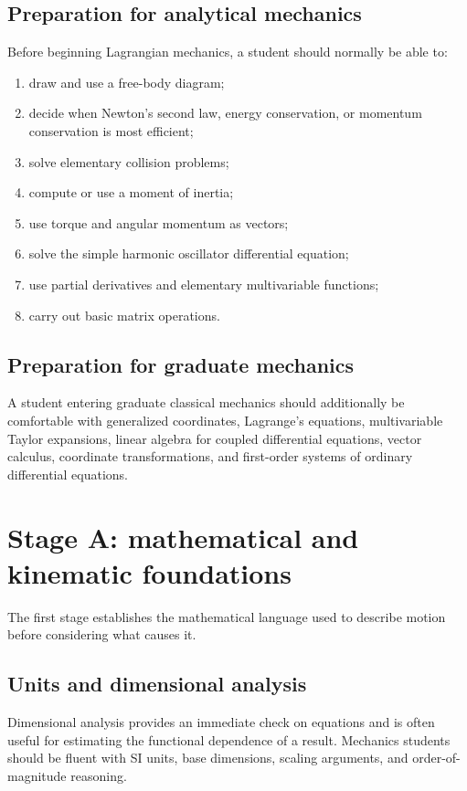 \subsection*{Preparation for analytical mechanics}

Before beginning Lagrangian mechanics, a student should normally be able to:
\begin{enumerate}
\item draw and use a free-body diagram;
\item decide when Newton's second law, energy conservation, or momentum conservation is most efficient;
\item solve elementary collision problems;
\item compute or use a moment of inertia;
\item use torque and angular momentum as vectors;
\item solve the simple harmonic oscillator differential equation;
\item use partial derivatives and elementary multivariable functions;
\item carry out basic matrix operations.
\end{enumerate}

\subsection*{Preparation for graduate mechanics}

A student entering graduate classical mechanics should additionally be comfortable with generalized
coordinates, Lagrange's equations, multivariable Taylor expansions, linear algebra for coupled
differential equations, vector calculus, coordinate transformations, and first-order systems of
ordinary differential equations.

\section{Stage A: mathematical and kinematic foundations}

The first stage establishes the mathematical language used to describe motion before considering
what causes it.

\subsection*{Units and dimensional analysis}

Dimensional analysis provides an immediate check on equations and is often useful for estimating
the functional dependence of a result.  Mechanics students should be fluent with SI units, base
dimensions, scaling arguments, and order-of-magnitude reasoning.


